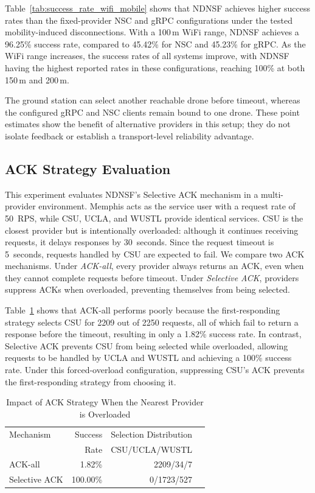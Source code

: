 Table~\ref{tab:success_rate_wifi_mobile} shows that NDNSF achieves higher success rates than the fixed-provider NSC and gRPC configurations under the tested mobility-induced disconnections. With a 100\,m WiFi range, NDNSF achieves a 96.25\% success rate, compared to 45.42\% for NSC and 45.23\% for gRPC. As the WiFi range increases, the success rates of all systems improve, with NDNSF having the highest reported rates in these configurations, reaching 100\% at both 150\,m and 200\,m.

The ground station can select another reachable drone before timeout, whereas the configured gRPC and NSC clients remain bound to one drone. These point estimates show the benefit of alternative providers in this setup; they do not isolate feedback or establish a transport-level reliability advantage.


\subsection{ACK Strategy Evaluation}
\label{sec:selective-ack}

This experiment evaluates NDNSF's Selective ACK mechanism in a multi-provider environment. Memphis acts as the service user with a request rate of 50~RPS, while CSU, UCLA, and WUSTL provide identical services. CSU is the closest provider but is intentionally overloaded: although it continues receiving requests, it delays responses by 30~seconds. Since the request timeout is 5~seconds, requests handled by CSU are expected to fail.  We compare two ACK mechanisms. Under \emph{ACK-all}, every provider always returns an ACK, even when they cannot complete requests before timeout. Under \emph{Selective ACK}, providers suppress ACKs when overloaded, preventing themselves from being selected.

Table~\ref{tab:selective-ack} shows that ACK-all performs poorly because the first-responding strategy selects CSU for 2209 out of 2250 requests, all of which fail to return a response before the timeout, resulting in only a 1.82\% success rate. In contrast, Selective ACK prevents CSU from being selected while overloaded, allowing requests to be handled by UCLA and WUSTL and achieving a 100\% success rate. Under this forced-overload configuration, suppressing CSU's ACK prevents the first-responding strategy from choosing it.

\begin{table}[]
  \centering
  \caption{Impact of ACK Strategy When the Nearest Provider is Overloaded}
  \label{tab:selective-ack}
  \setlength{\tabcolsep}{4pt}

  \begin{tabular}{l r r r}
    \toprule
    Mechanism &
    Success &
    Selection Distribution \\
    &
    Rate &
    CSU/UCLA/WUSTL \\
    \midrule
    ACK-all       & 1.82\% & 2209/34/7 \\
    Selective ACK  & 100.00\% & 0/1723/527 \\
    \bottomrule
  \end{tabular}
  \vspace{-3mm}
\end{table}

